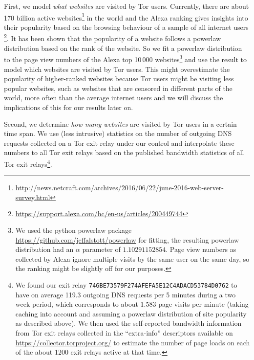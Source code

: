 First, we model \emph{what websites} are visited by Tor users.
Currently, there are about 170 billion active
websites\footnote{\url{http://news.netcraft.com/archives/2016/06/22/june-2016-web-server-survey.html}}
in the world and the Alexa ranking gives insights into their popularity
based on the browsing behaviour of a sample of all internet users
\footnote{\url{https://support.alexa.com/hc/en-us/articles/200449744}}.  
It has been shown that the popularity of a website follows a powerlaw
distribution based on the rank of the website. So
we fit a powerlaw distribution to the page view numbers of the Alexa top
10\,000 websites\footnote{We used the python powerlaw package
		\url{https://github.com/jeffalstott/powerlaw} for fitting, the
		resulting powerlaw distribution had an $\alpha$ parameter of
		$1.10291152854$. Page view numbers as collected by Alexa ignore
		multiple visits by the same user on the same day, so the ranking
		might be slightly off for our purposes.} and use the result to
model which websites are visited by Tor users. 
This might overestimate the popularity of higher-ranked websites because
Tor users might be visiting less popular websites, such as websites that
are censored in different parts of the world, more often than the
average internet users and we will discuss the implications of this for
our results later on.

Second, we determine \emph{how many websites} are visited by Tor users in a
certain time span. We use (less intrusive) statistics on the number of
outgoing DNS requests collected on a Tor exit relay under our control
and interpolate these numbers to all Tor exit relays based on the
published bandwidth statistics of all Tor exit relays\footnote{We found
		our exit relay \texttt{746BE73579F274AFEFA5E12C4ADACD53784D0762}
		to have on average 119.3 outgoing DNS requests per 5 minutes
		during a two week period, which corresponds to about 1.583 page
		visits per minute (taking caching into account and assuming a
		powerlaw distribution of site popularity as described above). We
		then used the self-reported bandwidth information from Tor exit
		relays collected in the ``extra-info'' descriptors available on
		\url{https://collector.torproject.org/} to estimate the number
		of page loads on each of the about 1200 exit relays active at
		that time.}.


